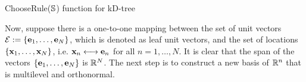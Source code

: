 \documentclass[11pt,final]{amsart}       %
\begin{document}
\begin{algorithm}[h]
  \KwIn{ $\bbS$}

\caption{ChooseRule($\bbS$) function for kD-tree}
\label{RPMLB:algorithm2-kd}
\end{algorithm}


Now, suppose there is a one-to-one mapping between the set of unit
vectors ${\mathcal E}:=\{\mathbf{e}_{1},\dots,\mathbf{e}_{N}\}$, which is denoted as
leaf unit vectors, and the set of locations $\{
\mathbf{x}_{1},\dots,\mathbf{x}_{N}\}$, i.e. $\mathbf{x}_{n} \longleftrightarrow \mathbf{e}_{n}$
for all $n = 1, \dots, N$. It is clear that the span of the vectors
$\{\mathbf{e}_{1},\dots,\mathbf{e}_{N}\}$ is $\mathbb{R}^{N}$.  The next step is to
construct a new basis of $\Bbb{R}^{n}$ that is multilevel and orthonormal.
\end{document}
